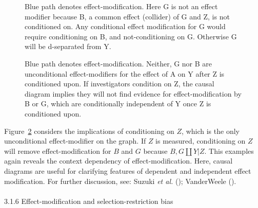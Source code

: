 \documentclass[
  singlecolumn]{article}
\makeatletter
\let\oldparagraph\paragraph
\renewcommand{\paragraph}{
    \@ifstar
      \xxxParagraphStar
      \xxxParagraphNoStar
  }
\newcommand{\xxxParagraphStar}[1]{\oldparagraph*{#1}\mbox{}}
\newcommand{\xxxParagraphNoStar}[1]{\oldparagraph{#1}\mbox{}}
\makeatother
\begin{document}
\begin{figure}


\caption{\label{fig-dag-effect-modification-5b}Blue path denotes
effect-modification. Here G is not an effect modifier because B, a
common effect (collider) of G and Z, is not conditioned on. Any
conditional effect modification for G would require conditioning on B,
and not-conditioning on G. Otherwise G will be d-separated from Y.}

\end{figure}%

\begin{figure}


\caption{\label{fig-dag-effect-modification-5c}Blue path denotes
effect-modification. Neither, G nor B are unconditional effect-modifiers
for the effect of A on Y after Z is conditioned upon. If investigators
condition on Z, the causal diagram implies they will not find evidence
for effect-modification by B or G, which are conditionally independent
of Y once Z is conditioned upon.}

\end{figure}%

Figure~\ref{fig-dag-effect-modification-5c} considers the implications
of conditioning on \(Z\), which is the only unconditional
effect-modifier on the graph. If \(Z\) is measured, conditioning on
\(Z\) will remove effect-modification for \(B\) and \(G\) because
\(B,G\coprod Y |Z\). This examples again reveals the context dependency
of effect-modification. Here, causal diagrams are useful for clarifying
features of dependent and independent effect modification. For further
discussion, see: Suzuki \emph{et al.}
(); VanderWeele
().

\paragraph{3.1.6 Effect-modification and selection-restriction
bias}\label{effect-modification-and-selection-restriction-bias}
\end{document}
